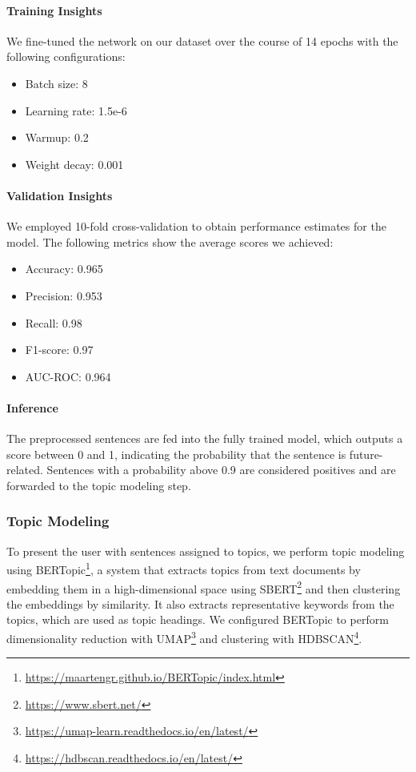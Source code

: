 \documentclass[sigconf]{acmart}
\begin{document}
\paragraph{Training Insights}
We fine-tuned the network on our dataset over the course of 14 epochs with the following configurations:
\begin{itemize}
    \item Batch size: 8
    \item Learning rate: 1.5e-6
    \item Warmup: 0.2
    \item Weight decay: 0.001
\end{itemize}

\paragraph{Validation Insights}
We employed 10-fold cross-validation to obtain performance estimates for the model. The following metrics show the average scores we achieved:
\begin{itemize}
    \item Accuracy: 0.965
    \item Precision: 0.953
    \item Recall: 0.98
    \item F1-score: 0.97
    \item AUC-ROC: 0.964
\end{itemize}
\paragraph{Inference}
The preprocessed sentences are fed into the fully trained model, which outputs a score between 0 and 1, indicating the probability that the sentence is future-related. Sentences with a probability above 0.9 are considered positives and are forwarded to the topic modeling step. %

\subsubsection{Topic Modeling}
To present the user with sentences assigned to topics, we perform topic modeling using BERTopic\footnote{\url{https://maartengr.github.io/BERTopic/index.html}}, a system that extracts topics from text documents by embedding them in a high-dimensional space using SBERT\footnote{\url{https://www.sbert.net/}} and then clustering the embeddings by similarity.
It also extracts representative keywords from the topics, which are used as topic headings. We configured BERTopic to perform dimensionality reduction with UMAP\footnote{\url{https://umap-learn.readthedocs.io/en/latest/}} and clustering with HDBSCAN\footnote{\url{https://hdbscan.readthedocs.io/en/latest/}}.
\end{document}
